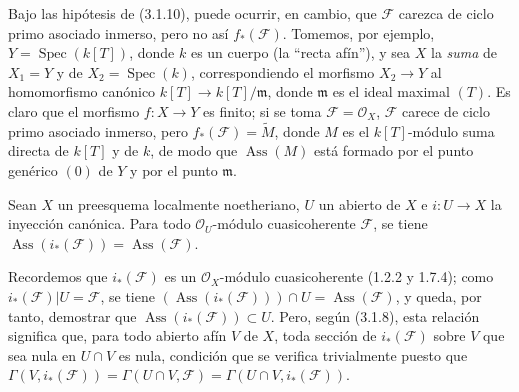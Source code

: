 \begin{remark}[3.1.12]
\label{IV.2.3.1.12-fr}
Bajo las hipótesis de (3.1.10), puede ocurrir, en cambio, que $\mathcal F$
carezca de ciclo primo asociado inmerso, pero no así $f_*(\mathcal F)$.
Tomemos, por ejemplo, $Y=\operatorname{Spec}(k[T])$, donde $k$ es un cuerpo
(la ``recta afín''), y sea $X$ la \emph{suma} de $X_1=Y$ y de
$X_2=\operatorname{Spec}(k)$, correspondiendo el morfismo $X_2\to Y$ al
homomorfismo canónico $k[T]\to k[T]/\mathfrak m$, donde $\mathfrak m$ es el
ideal maximal $(T)$. Es claro que el morfismo $f:X\to Y$ es finito; si se toma
$\mathcal F=\mathcal O_X$, $\mathcal F$ carece de ciclo primo asociado
inmerso, pero $f_*(\mathcal F)=\widetilde M$, donde $M$ es el
$k[T]$-módulo suma directa de $k[T]$ y de $k$, de modo que
$\operatorname{Ass}(M)$ está formado por el punto genérico $(0)$ de $Y$ y por
el punto $\mathfrak m$.
\end{remark}

\begin{proposition}[3.1.13]
\label{IV.2.3.1.13-fr}
Sean $X$ un preesquema localmente noetheriano, $U$ un abierto de $X$ e
$i:U\to X$ la inyección canónica. Para todo $\mathcal O_U$-módulo
cuasicoherente $\mathcal F$, se tiene
$\operatorname{Ass}(i_*(\mathcal F))=\operatorname{Ass}(\mathcal F)$.
\end{proposition}

Recordemos que $i_*(\mathcal F)$ es un $\mathcal O_X$-módulo cuasicoherente
(1.2.2 y 1.7.4); como $i_*(\mathcal F)|U=\mathcal F$, se tiene
$(\operatorname{Ass}(i_*(\mathcal F)))\cap U=\operatorname{Ass}(\mathcal F)$,
y queda, por tanto, demostrar que
$\operatorname{Ass}(i_*(\mathcal F))\subset U$. Pero, según (3.1.8), esta
relación significa que, para todo abierto afín $V$ de $X$, toda sección de
$i_*(\mathcal F)$ sobre $V$ que sea nula en $U\cap V$ es nula, condición que
se verifica trivialmente puesto que
$\Gamma(V,i_*(\mathcal F))=\Gamma(U\cap V,\mathcal F)
=\Gamma(U\cap V,i_*(\mathcal F))$.

